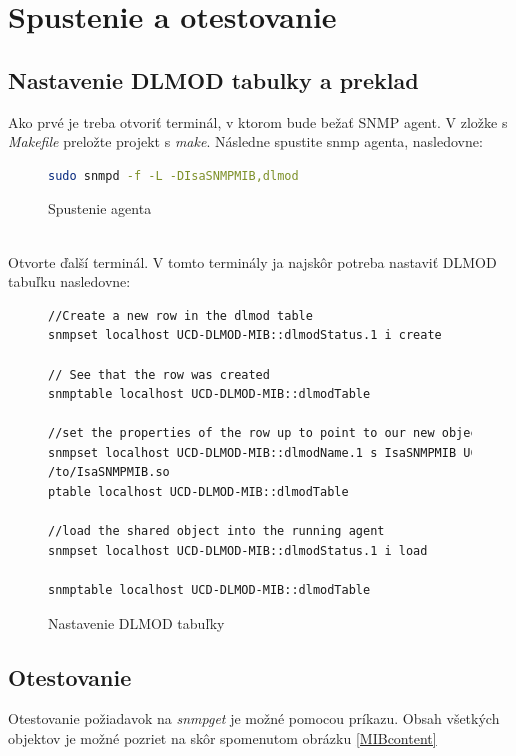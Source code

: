\documentclass{article}
\begin{document}
    \section{Spustenie a otestovanie}
    \subsection{Nastavenie DLMOD tabulky a preklad}
	Ako prvé je treba otvoriť terminál, v ktorom bude bežať SNMP agent. V zložke s \textit{Makefile} preložte projekt s \textit{make}. Následne spustite snmp agenta, nasledovne:
	\begin{figure}[!htb]
	    \begin{lstlisting}[language=bash]
                    sudo snmpd -f -L -DIsaSNMPMIB,dlmod
        \end{lstlisting}
        \caption{Spustenie agenta}
    \end{figure}
   \vspace{1cm}
   \\
   Otvorte ďalší terminál. V tomto terminály ja najskôr potreba nastaviť DLMOD tabuľku nasledovne: 
	\begin{figure}[!htb]
	    \begin{lstlisting}[language=bash]
//Create a new row in the dlmod table
snmpset localhost UCD-DLMOD-MIB::dlmodStatus.1 i create

// See that the row was created
snmptable localhost UCD-DLMOD-MIB::dlmodTable 

//set the properties of the row up to point to our new object and to give it a name
snmpset localhost UCD-DLMOD-MIB::dlmodName.1 s IsaSNMPMIB UCD-DLMOD-MIB::dlmodPath.1 s /path
/to/IsaSNMPMIB.so
ptable localhost UCD-DLMOD-MIB::dlmodTable 

//load the shared object into the running agent
snmpset localhost UCD-DLMOD-MIB::dlmodStatus.1 i load 

snmptable localhost UCD-DLMOD-MIB::dlmodTable 
        \end{lstlisting}
        \caption{Nastavenie DLMOD tabuľky}
    \end{figure}
   \vspace{1cm}
	\subsection{Otestovanie}
	Otestovanie požiadavok na \textit{snmpget} je možné pomocou príkazu. Obsah všetkých objektov je možné pozriet na skôr spomenutom obrázku \ref{MIBcontent}
\end{document}

